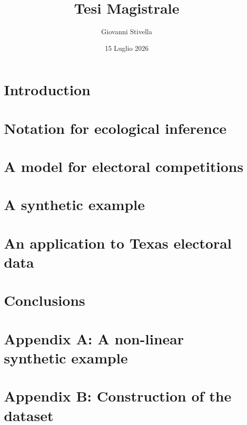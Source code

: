\documentclass[12pt]{paper}
\title{Tesi Magistrale}
\author{Giovanni Stivella}
\date{15 Luglio 2026}
\theoremstyle{definition}
\begin{document}


\newpage
\section{Introduction} \label{sec:introduction}


\newpage
\section{Notation for ecological inference} \label{sec:Notation for ecological inference}



\newpage
\section{A model for electoral competitions} \label{sec:model}


\newpage
\section{A synthetic example} \label{sec:A synthetic example}


\newpage
\section{An application to Texas electoral data} \label{sec:An application to US data}


\clearpage
\section{Conclusions} \label{sec:conclusions}
 


\newpage
\nocite{*}

\printbibliography

\newpage
\section{Appendix A: A non-linear synthetic example} \label{sec:Appendix_exp}


\newpage
\section{Appendix B: Construction of the dataset} \label{sec:Appendix_dataset}

\end{document}
